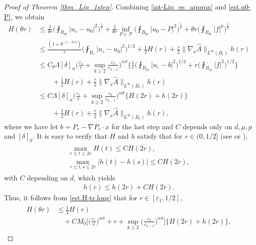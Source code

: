 \documentclass[reqno,12pt]{amsart} %
\theoremstyle{definition}
\theoremstyle{remark}
\numberwithin{equation}{section}
\newcommand{\e}{\varepsilon}
\begin{document}
\begin{proof}[Proof of Theorem \ref{thm_Lip_1step}]
    Combining \eqref{int-Lip_es_approx} and \eqref{est.u0-P}, we obtain
    \begin{align}
        H(\theta r)&\leq \frac{1}{\theta r}\bigg(\fint_{B_{\theta r}}|u_\varepsilon-u_0|^2\bigg)^{\frac{1}{2}}+\frac{1}{\theta r}\inf_{P\in \mathcal{P}}\bigg(\fint_{B_{\theta r}}|u_0-P|^2\bigg)^{\frac{1}{2}}+\theta r\bigg(\fint_{B_{\theta r}}|f|^p\bigg)^{\frac{1}{p}}\nonumber\\
        & \leq \frac{(1+\theta^{-1-d/2})}{r}\bigg(\fint_{B_r}|u_\varepsilon-u_0|^2\bigg)^{1/2}+\frac{1}{2}H(r)+\frac{r}{2}\|\nabla_x\widehat{A}\|_{L^\infty(B_r)} h(r)\nonumber\\
        &\leq C_\theta \Lambda [\delta]_\alpha\bigg(\frac{\varepsilon_1}{r}+\sup_{k\geq 2}\frac{\e_k}{\e_{k-1}}\bigg)^{\alpha\sigma} \bigg\{\frac{1}{r}\bigg(\fint_{B_{2r}}|u_\varepsilon-b|^2\bigg)^{1/2}+r\bigg(\fint_{B_{2r}}|f|^2\bigg)^{1/2}\bigg\}\nonumber\\
        &\qquad + \frac{1}{2}H(r)+\frac{r}{2}\|\nabla_x\widehat{A}\|_{L^\infty(B_r)} h(r)\nonumber\\&\leq C \Lambda [\delta]_\alpha\bigg(\frac{\varepsilon_1}{r}+\sup_{k\geq 2}\frac{\e_k}{\e_{k-1}}\bigg)^{\alpha\sigma}\{H(2r)+h(2r)\}\nonumber\\
        &\qquad +\frac{1}{2}H(r)+\frac{r}{2}\|\nabla_x\widehat{A}\|_{L^\infty(B_r)} h(r),\label{est.H-tr.long}
    \end{align}
    where we have let $b=P_r-\nabla P_r \cdot x$ for the last step and $C$ depends only on $d, \mu, p$ and $[\delta]_0$. It is easy to verify that $H$ and $h$ satisfy that for $r\in(0, 1/2]$ (see \cite[Theorem 6.4.1]{Shen_book} or \cite[Lemma 6.4]{Niu20_reiterated}),
    \begin{align}\label{int-Lip_cond_Hh}
    \begin{split}
        \max_{r\leq t\leq 2r} H(t)\leq C H(2r), \\\max_{r\leq t, s\leq 2r} | h(t)-h(s)|\leq C H(2r),
    \end{split}
    \end{align}
    with $C$ depending on $d$, which yields
    \begin{align*}
        h(r)\leq h(2r)+CH(2r).
    \end{align*}
    Thus, it follows from \eqref{est.H-tr.long} that for $r\in[\varepsilon_1, 1/2]$,
    \begin{align}\label{est.H-thetar}
    \begin{split}
        H(\theta r)&\leq \frac{1}{2}H(r)\\&\quad+CM_0\bigg[\Big(\frac{\varepsilon_1}{r}\Big)^{\alpha\sigma}+r+\sup_{k\geq 2}\bigg(\frac{\varepsilon_k}{\varepsilon_{k-1}}\bigg)^{\alpha\sigma}\bigg]\{H(2r)+h(2r)\},

\end{split}
\end{align}
\end{proof}
\end{document}
